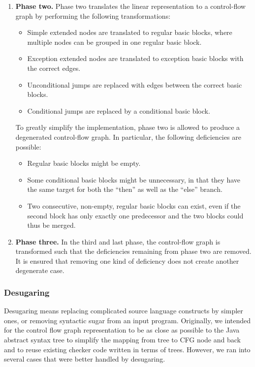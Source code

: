 \begin{enumerate}
    \item \textbf{Phase two.} Phase two translates the linear
      representation to a control-flow graph by performing the
      following transformations:
    \begin{itemize}
        \item Simple extended nodes are translated to regular basic
          blocks, where multiple nodes can be grouped in one regular
          basic block.
        \item Exception extended nodes are translated to exception
          basic blocks with the correct edges.
        \item Unconditional jumps are replaced with edges between the
          correct basic blocks.
        \item Conditional jumps are replaced by a conditional basic
          block.
    \end{itemize}
    To greatly simplify the implementation, phase two is allowed to
    produce a degenerated control-flow graph. In particular, the
    following deficiencies are possible:
    \begin{itemize}
    \item Regular basic blocks might be empty.
    \item Some conditional basic blocks might be unnecessary, in that
      they have the same target for both the ``then'' as well as the
      ``else'' branch.
    \item Two consecutive, non-empty, regular basic blocks can exist,
      even if the second block has only exactly one predecessor and
      the two blocks could thus be merged.
    \end{itemize}
    \item \textbf{Phase three.} In the third and last phase, the
      control-flow graph is transformed such that the deficiencies
      remaining from phase two are removed. It is ensured that
      removing one kind of deficiency does not create another
      degenerate case.
\end{enumerate}



\subsubsection{Desugaring}
\label{sec:desugaring}

Desugaring means replacing complicated source language constructs by
simpler ones, or removing syntactic sugar from an input program.
Originally, we intended for the control flow graph representation to
be as close as possible to the Java abstract syntax tree to simplify
the mapping from tree to CFG node and back and to reuse existing
checker code written in terms of trees.  However, we ran into several
cases that were better handled by desugaring.

